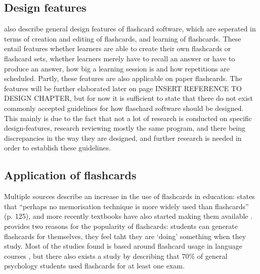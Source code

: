 \subsection{Design features}

 also describe general design features of flashcard software, which are seperated in terms of creation and editing of flashcards, and learning of flashcards. These entail features whether learners are able to create their own flashcards or flashcard sets, whether learners merely have to recall an answer or have to produce an answer, how big a learning session is and how repetitions are scheduled. Partly, these features are also applicable on paper flashcards. The features will be further elaborated later on page INSERT REFERENCE TO DESIGN CHAPTER, but for now it is sufficient to state that there do not exist commonly accepted guidelines for how flaschard software should be designed. This mainly is due to the fact that not a lot of research is conducted on specific design-features, research reviewing mostly the same program, and there being discrepancies in the way they are designed, and further research is needed in order to establish these guidelines.


\subsection{Application of flashcards}

Multiple sources describe an increase in the use of flashcards in education:  states that ``perhaps no memorisation technique is more widely used than flashcards'' (p. 125), and more recently textbooks have also started making them available \cite{burgess, golding}.  provides two reasons for the popularity of flashcards: students can generate flashcards for themselves, they feel taht they are `doing' something when they study. Most of the studies found is based around flashcard usage in language courses \cite{nakata, joseph, chien}, but there also exists a study by  describing that 70\% of general psychology students used flashcards for at least one exam.

